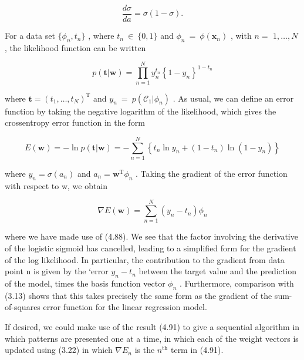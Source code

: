 \documentclass[
  10
]{article}
\begin{document}
\[
\frac {d \sigma}{d a} = \sigma (1 - \sigma).\tag{4.88}
\]

For a data set \(\{ \phi _ { n } , t _ { n } \}\) , where
\(t _ { n } ~ \in ~ \{ 0 , 1 \}\) and
\(\phi _ { n } ~ = ~ \phi ( \mathbf { x } _ { n } )\) , with \(n =\)
\(1 , \ldots , N\) , the likelihood function can be written

\[
p (\mathbf {t} | \mathbf {w}) = \prod_ {n = 1} ^ {N} y _ {n} ^ {t _ {n}} \left\{1 - y _ {n} \right\} ^ {1 - t _ {n}}\tag{4.89}
\]

where
\({ \mathbf t } = ( t _ { 1 } , \ldots , t _ { N } ) ^ { \mathrm { T } }\)
and \(y _ { n } ~ = ~ p ( \mathcal { C } _ { 1 } | \phi _ { n } )\) . As
usual, we can define an error function by taking the negative logarithm
of the likelihood, which gives the crossentropy error function in the
form

\[
E (\mathbf {w}) = - \ln p (\mathbf {t} | \mathbf {w}) = - \sum_ {n = 1} ^ {N} \left\{t _ {n} \ln y _ {n} + (1 - t _ {n}) \ln (1 - y _ {n}) \right\}\tag{4.90}
\]

where \(y _ { n } = \sigma ( a _ { n } )\) and
\(a _ { n } = \mathbf { w } ^ { \mathrm { T } } \phi _ { n }\) . Taking
the gradient of the error function with respect to w, we obtain

\[
\nabla E (\mathbf {w}) = \sum_ {n = 1} ^ {N} (y _ {n} - t _ {n}) \phi_ {n}\tag{4.91}
\]

where we have made use of (4.88). We see that the factor involving the
derivative of the logistic sigmoid has cancelled, leading to a
simplified form for the gradient of the log likelihood. In particular,
the contribution to the gradient from data point n is given by the
`error \(y _ { n } - t _ { n }\) between the target value and the
prediction of the model, times the basis function vector
\(\phi _ { n }\) . Furthermore, comparison with (3.13) shows that this
takes precisely the same form as the gradient of the sum-of-squares
error function for the linear regression model.

If desired, we could make use of the result (4.91) to give a sequential
algorithm in which patterns are presented one at a time, in which each
of the weight vectors is updated using (3.22) in which
\(\nabla E _ { n }\) is the \(n ^ { \mathrm { t h } }\) term in (4.91).
\end{document}
